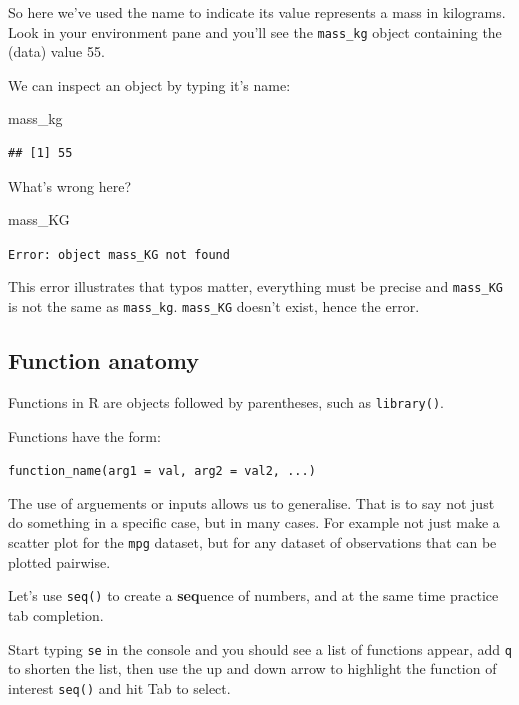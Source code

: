 \documentclass[12pt,]{book}
\newenvironment{Shaded}{\begin{snugshade}}{\end{snugshade}}
\newcommand{\NormalTok}[1]{#1}
\theoremstyle{definition}
\theoremstyle{definition}
\theoremstyle{definition}
\theoremstyle{remark}
\begin{document}
So here we've used the name to indicate its value represents a mass in
kilograms. Look in your environment pane and you'll see the
\texttt{mass\_kg} object containing the (data) value 55.

We can inspect an object by typing it's name:

\begin{Shaded}
\begin{Highlighting}[]
\NormalTok{mass_kg}
\end{Highlighting}
\end{Shaded}

\begin{verbatim}
## [1] 55
\end{verbatim}

What's wrong here?

\begin{Shaded}
\begin{Highlighting}[]
\NormalTok{mass_KG}
\end{Highlighting}
\end{Shaded}

\texttt{Error:\ object\ \textquotesingle{}mass\_KG\textquotesingle{}\ not\ found}

This error illustrates that typos matter, everything must be precise and
\texttt{mass\_KG} is not the same as \texttt{mass\_kg}.
\texttt{mass\_KG} doesn't exist, hence the error.

\hypertarget{function-anatomy}{\subsection{Function
anatomy}\label{function-anatomy}}

Functions in R are objects followed by parentheses, such as
\texttt{library()}.

Functions have the form:

\texttt{function\_name(arg1\ =\ val,\ arg2\ =\ val2,\ ...)}

The use of arguements or inputs allows us to generalise. That is to say
not just do something in a specific case, but in many cases. For example
not just make a scatter plot for the \texttt{mpg} dataset, but for any
dataset of observations that can be plotted pairwise.

Let's use \texttt{seq()} to create a \textbf{seq}uence of numbers, and
at the same time practice tab completion.

Start typing \texttt{se} in the console and you should see a list of
functions appear, add \texttt{q} to shorten the list, then use the up
and down arrow to highlight the function of interest \texttt{seq()} and
hit Tab to select.
\end{document}
